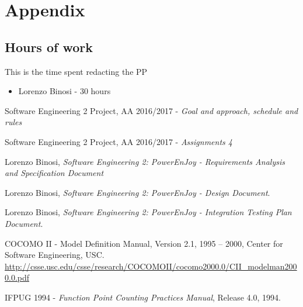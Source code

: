 \appendix \label{sec appendix}

\section{Appendix} 

\subsection{Hours of work}
This is the time spent redacting the PP
\begin{itemize}
	\item {Lorenzo Binosi} -   30 hours
\end{itemize}

\begin{thebibliography}{1}	
	Software Engineering 2 Project, AA 2016/2017 - \emph{Goal and approach, schedule and rules}
	
	Software Engineering 2 Project, AA 2016/2017 - \emph{Assignments 4}
	
	Lorenzo Binosi, \emph{Software Engineering 2: PowerEnJoy - Requirements Analysis and Specification Document}
	
	Lorenzo Binosi, \emph{Software Engineering 2: PowerEnJoy - Design Document}.

	Lorenzo Binosi, \emph{Software Engineering 2: PowerEnJoy - Integration Testing Plan Document}.

	COCOMO II - Model Definition Manual, Version 2.1, 1995 – 2000, Center for Software Engineering, USC. \\
	\url{http://csse.usc.edu/csse/research/COCOMOII/cocomo2000.0/CII_modelman2000.0.pdf}

	IFPUG 1994 - \emph{Function Point Counting Practices Manual}, Release 4.0, 1994.
\end{thebibliography}